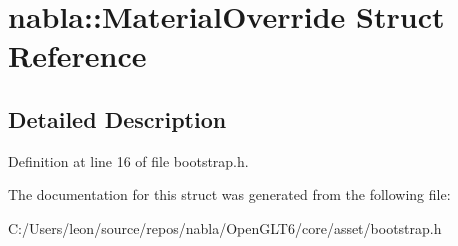 \hypertarget{structnabla_1_1_material_override}{}\section{nabla\+::Material\+Override Struct Reference}
\label{structnabla_1_1_material_override}


\subsection{Detailed Description}


Definition at line 16 of file bootstrap.\+h.



The documentation for this struct was generated from the following file\+:\begin{DoxyCompactItemize}
\item 
C\+:/\+Users/leon/source/repos/nabla/\+Open\+G\+L\+T6/core/asset/bootstrap.\+h\end{DoxyCompactItemize}
